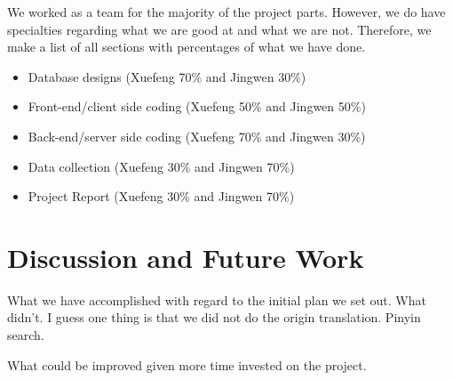 \documentclass[11pt]{article} %
\begin{document}
\indent We worked as a team for the majority of the project parts. However, we do have specialties regarding what we are good at and what we are not. Therefore, we make a list of all sections with percentages of what we have done.

\begin{itemize}
    \item Database designs (Xuefeng 70\% and Jingwen 30\%)
    \item Front-end/client side coding (Xuefeng 50\% and Jingwen 50\%)
    \item Back-end/server side coding (Xuefeng 70\% and Jingwen 30\%)
    \item Data collection (Xuefeng 30\% and Jingwen 70\%)
    \item Project Report (Xuefeng 30\% and Jingwen 70\%)
\end{itemize}

\section{Discussion and Future Work}
\indent What we have accomplished with regard to the initial plan we set out. What didn't. I guess one thing is that we did not do the origin translation. Pinyin search.

\indent What could be improved given more time invested on the project. 



\end{document}

